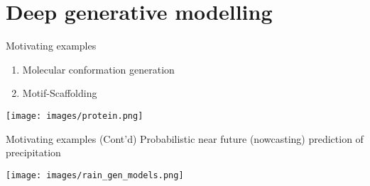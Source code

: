 \section{Deep generative modelling}




    

\begin{frame}{Motivating examples}
\begin{enumerate}
    \item[] Molecular conformation generation~\cite{xu2022GeoDiff}
    \item[] Motif-Scaffolding~\cite{trippe2022Diffusion}
\end{enumerate}

\begin{center}
    \vspace{-.5em}
    \texttt{[image: images/protein.png]}
    \vspace{.5em}
\end{center}

\end{frame}

\begin{frame}{Motivating examples (Cont'd)}
Probabilistic near future (nowcasting) prediction of precipitation~\cite{ravuri2021Skilful}
\begin{center}
\texttt{[image: images/rain\_gen\_models.png]}
\end{center}
\end{frame}



    
